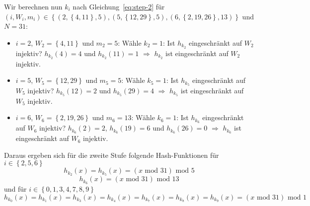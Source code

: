 \documentclass{article}
\begin{document}
Wir berechnen nun $k_i$ nach Gleichung~\ref{eq:step-2} f{\"u}r
$\left( i, W_i, m_i \right) \in \left\{ \left( 2, \left\{ 4, 11 \right\}, 5 \right), \left( 5, \left\{ 12, 29 \right\}, 5 \right), \left( 6, \left\{ 2, 19, 26 \right\}, 13 \right) \right\}$
und $N = 31$:
\parskip0pt\begin{itemize}
  \item $i = 2$, $W_2 = \left\{ 4, 11 \right\}$ und $m_2 = 5$: \newline
    W{\"a}hle $k_2 = 1$: Ist $h_{k_2}$ eingeschr{\"a}nkt auf $W_2$ injektiv?
    \newline $h_{k_2} \left( 4 \right) = 4$ und $h_{k_2} \left( 11 \right) = 1$
    $\Rightarrow$ $h_{k_2}$ ist eingeschr{\"a}nkt auf $W_2$ injektiv.
  \item $i = 5$, $W_5 = \left\{ 12, 29 \right\}$ und $m_5 = 5$: \newline
    W{\"a}hle $k_5 = 1$: Ist $h_{k_5}$ eingeschr{\"a}nkt auf $W_5$ injektiv?
    \newline $h_{k_5} \left( 12 \right) = 2$ und $h_{k_5} \left( 29 \right) = 4$
    $\Rightarrow$ $h_{k_5}$ ist eingeschr{\"a}nkt auf $W_5$ injektiv.
  \item $i = 6$, $W_6 = \left\{ 2, 19, 26 \right\}$ und $m_6 = 13$: \newline
    W{\"a}hle $k_6 = 1$: Ist $h_{k_6}$ eingeschr{\"a}nkt auf $W_6$ injektiv?
    \newline $h_{k_6} \left( 2 \right) = 2$, $h_{k_6} \left( 19 \right) = 6$ und
    $h_{k_6} \left( 26 \right) = 0$ $\Rightarrow$ $h_{k_6}$ ist eingeschr{\"a}nkt
    auf $W_6$ injektiv.
\end{itemize}

Daraus ergeben sich f{\"u}r die zweite Stufe folgende Hash-Funktionen f{\"u}r
$i \in \left\{ 2, 5, 6 \right\}$
\begin{equation}
  h_{k_2} \left( x \right) = h_{k_5} \left( x \right) = \left( x\text{ mod }31 \right)\text{ mod }5
  \label{eq:hk1}
\end{equation}
\begin{equation}
  h_{k_6} \left( x \right) = \left( x\text{ mod }31 \right)\text{ mod }13
\end{equation}
und f{\"u}r $i \in \left\{ 0, 1, 3, 4, 7, 8, 9 \right\}$
\begin{equation}
  h_{k_0} \left( x \right) = h_{k_1} \left( x \right) = h_{k_3} \left( x \right) = h_{k_4} \left( x \right) = h_{k_7} \left( x \right) = h_{k_8} \left( x \right) = h_{k_9} \left( x \right) = \left( x\text{ mod }31 \right)\text{ mod }1
  \label{eq:hki}
\end{equation}
\end{document}
